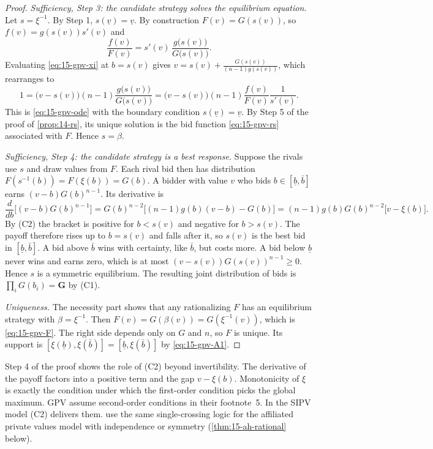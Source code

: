 \begin{proof}
\emph{Sufficiency, Step 3: the candidate strategy solves the equilibrium equation.} Let $s=\xi^{-1}$. By Step 1, $s(\underline v)=\underline v$. By construction $F(v)=G(s(v))$, so $f(v)=g(s(v))s'(v)$ and
\[
\frac{f(v)}{F(v)}=s'(v)\,\frac{g\big(s(v)\big)}{G\big(s(v)\big)}.
\]
Evaluating \eqref{eq:15-gpv-xi} at $b=s(v)$ gives $v=s(v)+\frac{G(s(v))}{(n-1)g(s(v))}$, which rearranges to
\[
1=\big(v-s(v)\big)(n-1)\frac{g\big(s(v)\big)}{G\big(s(v)\big)}=\big(v-s(v)\big)(n-1)\frac{f(v)}{F(v)}\frac{1}{s'(v)}.
\]
This is \eqref{eq:15-gpv-ode} with the boundary condition $s(\underline v)=\underline v$. By Step 5 of the proof of \cref{prop:14-rs}, its unique solution is the bid function \eqref{eq:15-gpv-rs} associated with $F$. Hence $s=\beta$.

\emph{Sufficiency, Step 4: the candidate strategy is a best response.} Suppose the rivals use $s$ and draw values from $F$. Each rival bid then has distribution $F(s^{-1}(b))=F(\xi(b))=G(b)$. A bidder with value $v$ who bids $b\in[\underline b,\bar b]$ earns $(v-b)G(b)^{n-1}$. Its derivative is
\[
\frac{d}{db}\Big[(v-b)G(b)^{n-1}\Big]=G(b)^{n-2}\Big[(n-1)g(b)(v-b)-G(b)\Big]=(n-1)g(b)G(b)^{n-2}\big[v-\xi(b)\big].
\]
By (C2) the bracket is positive for $b<s(v)$ and negative for $b>s(v)$. The payoff therefore rises up to $b=s(v)$ and falls after it, so $s(v)$ is the best bid in $[\underline b,\bar b]$. A bid above $\bar b$ wins with certainty, like $\bar b$, but costs more. A bid below $\underline b$ never wins and earns zero, which is at most $(v-s(v))G(s(v))^{n-1}\ge0$. Hence $s$ is a symmetric equilibrium. The resulting joint distribution of bids is $\prod_iG(b_i)=\mathbf G$ by (C1).

\emph{Uniqueness.} The necessity part shows that any rationalizing $F$ has an equilibrium strategy with $\beta=\xi^{-1}$. Then $F(v)=G(\beta(v))=G(\xi^{-1}(v))$, which is \eqref{eq:15-gpv-F}. The right side depends only on $G$ and $n$, so $F$ is unique. Its support is $[\xi(\underline b),\xi(\bar b)]=[\underline b,\xi(\bar b)]$ by \eqref{eq:15-gpv-A1}.
\end{proof}

Step 4 of the proof shows the role of (C2) beyond invertibility. The derivative of the payoff factors into a positive term and the gap $v-\xi(b)$. Monotonicity of $\xi$ is exactly the condition under which the first-order condition picks the global maximum. GPV assume second-order conditions in their footnote~5. In the SIPV model (C2) delivers them.  use the same single-crossing logic for the affiliated private values model with independence or symmetry (\cref{thm:15-ah-rational} below).

